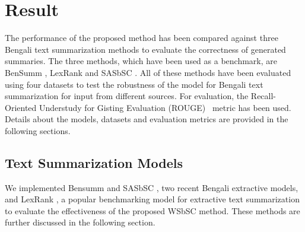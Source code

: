 \documentclass[acmlarge]{acmart}
\begin{document}

\section{Result}\label{sec:result}
The performance of the proposed method has been compared against three Bengali text summarization methods to evaluate the correctness of generated summaries. The three methods, which have been used as a benchmark, are BenSumm \cite{chowdhury-etal-2021-tfidf-clustering}, LexRank \cite{Erkan-lexRank-2004} and SASbSC \cite{roychowdhury-etal-2022-spectral-base}. All of these methods have been evaluated using four datasets to test the robustness of the model for Bengali text summarization for input from different sources. For evaluation, the Recall-Oriented Understudy for Gisting Evaluation (ROUGE)~\cite{lin-2004-rouge} metric has been used. Details about the models, datasets and evaluation metrics are provided in the following sections.
\subsection{Text Summarization Models}\label{subsec:text-summarization-models}
We implemented Bensumm \cite{chowdhury-etal-2021-tfidf-clustering} and SASbSC \cite{roychowdhury-etal-2022-spectral-base}, two recent Bengali extractive models, and LexRank \cite{Erkan-lexRank-2004}, a popular benchmarking model for extractive text summarization to evaluate the effectiveness of the proposed WSbSC method. These methods are further discussed in the following section.
\end{document}
